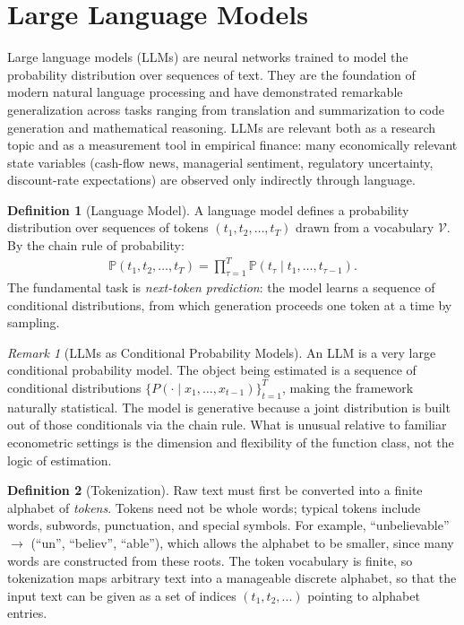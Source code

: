 \documentclass[11pt]{article}
\theoremstyle{definition}
\newtheorem{definition}{Definition}[section]
\theoremstyle{plain}
\theoremstyle{remark}
\newtheorem{remark}{Remark}[section]
\begin{document}
\section{Large Language Models}

Large language models (LLMs) are neural networks trained to model the probability distribution over sequences of text. They are the foundation of modern natural language processing and have demonstrated remarkable generalization across tasks ranging from translation and summarization to code generation and mathematical reasoning. LLMs are relevant both as a research topic and as a measurement tool in empirical finance: many economically relevant state variables (cash-flow news, managerial sentiment, regulatory uncertainty, discount-rate expectations) are observed only indirectly through language.


\begin{definition}[Language Model]
    A language model defines a probability distribution over sequences of tokens $(t_1, t_2, \dots, t_T)$ drawn from a vocabulary $\mathcal{V}$. By the chain rule of probability:
    \begin{align}
        \mathbb{P}(t_1, t_2, \dots, t_T) = \prod_{\tau=1}^T \mathbb{P}(t_\tau \mid t_1, \dots, t_{\tau-1}).
    \end{align}
    The fundamental task is \emph{next-token prediction}: the model learns a sequence of conditional distributions, from which generation proceeds one token at a time by sampling.
\end{definition}

\begin{remark}[LLMs as Conditional Probability Models]
    An LLM is a very large conditional probability model. The object being estimated is a sequence of conditional distributions $\{P(\cdot \mid x_1,\ldots,x_{t-1})\}_{t=1}^T$, making the framework naturally statistical. The model is generative because a joint distribution is built out of those conditionals via the chain rule. What is unusual relative to familiar econometric settings is the dimension and flexibility of the function class, not the logic of estimation.
\end{remark}


\begin{definition}[Tokenization]
    Raw text must first be converted into a finite alphabet of \emph{tokens}. Tokens need not be whole words; typical tokens include words, subwords, punctuation, and special symbols. For example, ``unbelievable'' $\to$ (``un'', ``believ'', ``able''), which allows the alphabet to be smaller, since many words are constructed from these roots. The token vocabulary is finite, so tokenization maps arbitrary text into a manageable discrete alphabet, so that the input text can be given as a set of indices $(t_1, t_2,...)$ pointing to alphabet entries.
\end{definition}
\end{document}
